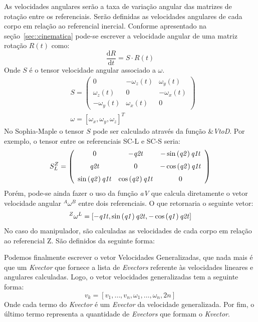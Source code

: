 As velocidades angulares serão a taxa de variação angular das matrizes de
rotação entre os referenciais. Serão definidas as velocidades angulares de cada
corpo em relação ao referencial inercial. Conforme apresentado na
seção~\ref{sec::cinematica} pode-se escrever a velocidade angular de uma matriz
rotação $R(t)$ como:
%
\begin{equation}
	\frac{\mathrm{d} R}{\mathrm{d} t} = S \cdot R(t)
\end{equation}
%
Onde $S$ é o tensor velocidade angular associado a $\omega$.
%
\begin{align}
& S = \begin{pmatrix}
0				& -\omega_{z}(t)	& \omega_{y}(t) \\ 
\omega_{z}(t)	& 0					& -\omega_{x}(t) \\ 
-\omega_{y}(t)	& \omega_{x}(t)		& 0
\end{pmatrix} \\
& \omega = [\omega_{x}, \omega_{y}, \omega_{z}]^{T}
\end{align}
%
No Sophia-Maple o tensor $S$ pode ser calculado através da função
\&\textit{VtoD}. Por exemplo, o tensor entre os referenciais SC-L e SC-S seria:
%
$$
S_{L}^{Z} = \left( \begin {array}{ccc} 0&-{\it q2t}&-\sin \left( {\it q2}
 \right) {\it q1t}\\ \noalign{\medskip}{\it q2t}&0&-\cos \left( {\it 
q2} \right) {\it q1t}\\ \noalign{\medskip}\sin \left( {\it q2}
 \right) {\it q1t}&\cos \left( {\it q2} \right) {\it q1t}&0
\end {array} \right)
$$
%
Porém, pode-se ainda fazer o uso da função \textit{aV} que
calcula diretamente o vetor velocidade angular $^{A}\omega^{B}$ entre dois
referenciais. O que retornaria o seguinte vetor:
%
$$
^{Z}\omega^{L} = [-{\it q1t},\sin \left( {\it q1} \right) {\it q2t},-\cos
\left( {\it q1} \right) {\it q2t}]
$$
%
No caso do manipulador, são calculadas as velocidades de cada corpo em relação
ao referencial Z. São definidos da seguinte forma:

\medskip {} \medskip 

Podemos finalmente escrever o vetor Velocidades Generalizadas, que nada mais é
que um \textit{Kvector} que fornece a lista de \textit{Evectors} referente às
velocidades lineares e angulares calculadas. Logo, o vetor velocidades
generalizadas tem a seguinte forma:
%
\begin{equation}
	v_{k} = [ v_{1},\ldots, v_{n}, \omega_{1},\ldots, \omega_{n}, 2n ]
\end{equation}
%
Onde cada termo do \textit{Kvector} é um \textit{Evector} da velocidade
generalizada.
Por fim, o último termo representa a quantidade de \textit{Evectors} que formam o
\textit{Kvector}.

